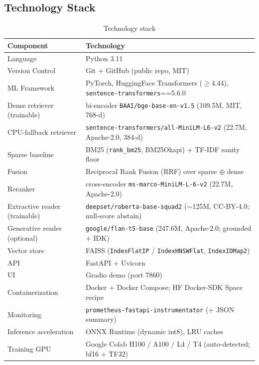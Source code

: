 \documentclass[12pt,a4paper]{article}
\begin{document}
\subsection{Technology Stack}

\begin{table}[H]
\centering
\caption{Technology stack}
\small
\begin{tabularx}{\linewidth}{@{} l L @{}}
\toprule
\textbf{Component} & \textbf{Technology} \\
\midrule
Language & Python 3.11 \\
Version Control & Git $+$ GitHub (public repo, MIT) \\
ML Framework & PyTorch, HuggingFace Transformers ($\geq$4.44), \texttt{sentence-transformers}==5.6.0 \\
Dense retriever (trainable) & bi-encoder \texttt{BAAI/bge-base-en-v1.5} (109.5M, MIT, 768-d) \\
CPU-fallback retriever & \texttt{sentence-transformers/all-MiniLM-L6-v2} (22.7M, Apache-2.0, 384-d) \\
Sparse baseline & BM25 (\texttt{rank\_bm25}, BM25Okapi) $+$ TF-IDF sanity floor \\
Fusion & Reciprocal Rank Fusion (RRF) over sparse $\oplus$ dense \\
Reranker & cross-encoder \texttt{ms-marco-MiniLM-L-6-v2} (22.7M, Apache-2.0) \\
Extractive reader (trainable) & \texttt{deepset/roberta-base-squad2} ($\sim$125M, CC-BY-4.0; null-score abstain) \\
Generative reader (optional) & \texttt{google/flan-t5-base} (247.6M, Apache-2.0; grounded $+$ IDK) \\
Vector store & FAISS (\texttt{IndexFlatIP} / \texttt{IndexHNSWFlat}, \texttt{IndexIDMap2}) \\
API & FastAPI $+$ Uvicorn \\
UI & Gradio demo (port 7860) \\
Containerization & Docker $+$ Docker Compose; HF Docker-SDK Space recipe \\
Monitoring & \texttt{prometheus-fastapi-instrumentator} ($+$ JSON summary) \\
Inference acceleration & ONNX Runtime (dynamic int8), LRU caches \\
Training GPU & Google Colab H100 / A100 / L4 / T4 (auto-detected; bf16 $+$ TF32) \\
\bottomrule
\end{tabularx}
\end{table}
\end{document}
